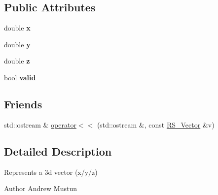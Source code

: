 \subsection*{Public Attributes}
\begin{DoxyCompactItemize}
\item 
\hypertarget{classRS__Vector_a81383ed1e6f744095698592fb7a4da87}{double {\bfseries x}}\label{classRS__Vector_a81383ed1e6f744095698592fb7a4da87}

\item 
\hypertarget{classRS__Vector_afb6a5512921abeaa92b9b7a1161a7657}{double {\bfseries y}}\label{classRS__Vector_afb6a5512921abeaa92b9b7a1161a7657}

\item 
\hypertarget{classRS__Vector_ac82be7d44c6e2848b6391fe22657ee74}{double {\bfseries z}}\label{classRS__Vector_ac82be7d44c6e2848b6391fe22657ee74}

\item 
\hypertarget{classRS__Vector_a218a279eef9451516eb2f35473471f06}{bool {\bfseries valid}}\label{classRS__Vector_a218a279eef9451516eb2f35473471f06}

\end{DoxyCompactItemize}
\subsection*{Friends}
\begin{DoxyCompactItemize}
\item 
std\-::ostream \& \hyperlink{classRS__Vector_a8929105d6fd14cd1727b9262f1b1e632}{operator$<$$<$} (std\-::ostream \&, const \hyperlink{classRS__Vector}{R\-S\-\_\-\-Vector} \&v)
\end{DoxyCompactItemize}


\subsection{Detailed Description}
Represents a 3d vector (x/y/z)

\begin{DoxyAuthor}{Author}
Andrew Mustun 
\end{DoxyAuthor}


